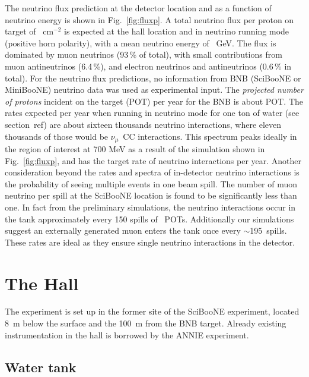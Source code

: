  The neutrino flux prediction at the detector location and as a function %
 of neutrino energy is shown in Fig.~\ref{fig:fluxp}.
 A total neutrino flux per proton on target of ~cm$^{-2}$ is expected at the %
 hall location and in neutrino running mode (positive horn polarity), with %
 a mean neutrino energy of ~GeV. 
 The flux is dominated by muon neutrinos (93\,\% of total), with small contributions from %
 muon antineutrinos (6.4\,\%), and electron neutrinos and antineutrinos (0.6\,\% in total). 
 For the neutrino flux predictions, no information from BNB %
 (SciBooNE or MiniBooNE) neutrino data was used as experimental input.
 The \emph{projected number of protons} incident on the target (POT) per year for the BNB %
 is about  POT.
 The rates expected per year when running in neutrino mode for one ton of water %
 (see section~ref) are about sixteen thousands neutrino interactions, %
 where eleven thousands of those would be $\nu_\mu$~CC interactions. 
 This spectrum peaks ideally in the region of interest at 700 MeV as a result of the simulation %
 shown in Fig.~\ref{fig:fluxp}, and has the target rate of neutrino interactions per year.
 Another consideration beyond the rates and spectra of in-detector neutrino interactions %
 is the probability of seeing multiple events in one beam spill. 
 The number of muon neutrino per spill at the SciBooNE location is found to be significantly %
 less than one.
 In fact from the preliminary simulations, the neutrino interactions occur%
 in the tank approximately every 150 spills of ~POTs. 
 Additionally our simulations suggest an externally generated muon enters the tank once %
 every $\sim$195~spills. 
 These rates are ideal as they ensure single neutrino interactions in the detector.
 
 \section{The Hall}
 \label{sec:hall}
 
 The experiment is set up in the former site of the SciBooNE experiment, %
 located 8~m below the surface and the 100~m from the BNB target.
 Already existing instrumentation in the hall is borrowed by the ANNIE experiment.

 \subsection{Water tank}
 \label{sec:tank}
 
